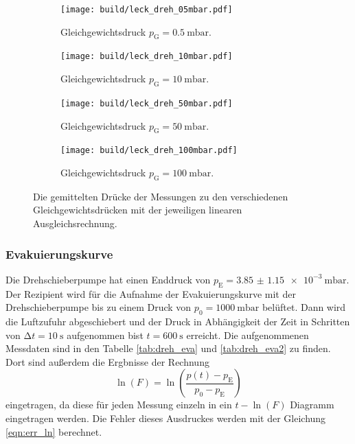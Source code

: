     \begin{figure}[h]
      \begin{subfigure}{0.48\textwidth}
        \centering
        \texttt{[image: build/leck\_dreh\_05mbar.pdf]}
        \caption{Gleichgewichtsdruck $p_\text{G} = \SI{0.5}{\milli\bar}$.}
        \label{fig:dreh_leck_05}
      \end{subfigure}
      \hfill
      \begin{subfigure}{0.48\textwidth}
        \centering
        \texttt{[image: build/leck\_dreh\_10mbar.pdf]}
        \caption{Gleichgewichtsdruck $p_\text{G} = \SI{10}{\milli\bar}$.}
        \label{fig:dreh_leck_10}
      \end{subfigure}
      \hfill
      \begin{subfigure}{0.48\textwidth}
        \centering
        \texttt{[image: build/leck\_dreh\_50mbar.pdf]}
        \caption{Gleichgewichtsdruck $p_\text{G} = \SI{50}{\milli\bar}$.}
        \label{fig:dreh_leck_50}
      \end{subfigure}
      \hfill
      \begin{subfigure}{0.48\textwidth}
        \centering
        \texttt{[image: build/leck\_dreh\_100mbar.pdf]}
        \caption{}Gleichgewichtsdruck $p_\text{G} = \SI{100}{\milli\bar}$.
        \label{fig:dreh_leck_100}
      \end{subfigure}
      \caption{Die gemittelten Drücke der Messungen zu den verschiedenen Gleichgewichtsdrücken mit der jeweiligen linearen Ausgleichsrechnung.}
      \label{fig:dreh_leck}
    \end{figure}

  \subsubsection{Evakuierungskurve}

    \noindent Die Drehschieberpumpe hat einen Enddruck von $p_\text{E} = \SI{3.85(115)e-3}{\milli\bar}$. Der Rezipient wird für die Aufnahme der Evakuierungskurve mit der Drehschieberpumpe 
    bis zu einem Druck von $p_0 = \SI{1000}{\milli\bar}$ belüftet. Dann wird die Luftzufuhr abgeschiebert und der Druck in Abhängigkeit der Zeit in 
    Schritten von $\increment t = \SI{10}{\second}$ aufgenommen bist $t = \SI{600}{\second}$ erreicht. Die aufgenommenen Messdaten sind in den Tabelle \ref{tab:dreh_eva} und \ref{tab:dreh_eva2} zu finden. 
    Dort sind außerdem die Ergbnisse der Rechnung 
    \begin{equation*}
      \ln(F) = \ln \left( \frac{p(t) - p_\text{E}}{p_0 - p_\text{E}}\right)
    \end{equation*}
    eingetragen, da diese für jeden Messung einzeln in ein $t - \ln(F)$ Diagramm eingetragen werden. Die Fehler dieses Ausdruckes werden mit der Gleichung \eqref{eqn:err_ln} berechnet.  

